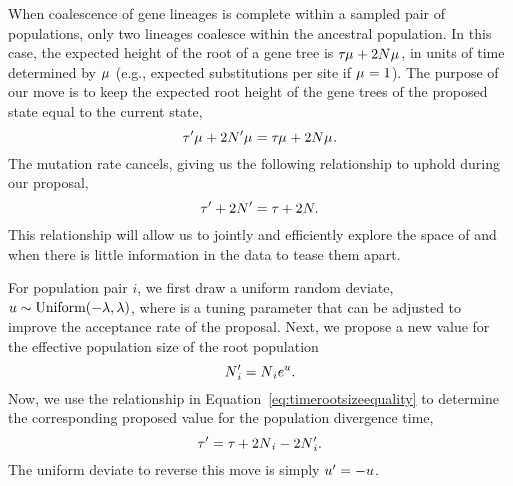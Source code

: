 \begin{linenomath}
When coalescence of gene lineages is complete within a sampled pair of
populations, only two lineages coalesce within the ancestral population.
In this case, the expected height of the root of a gene tree is
$\divtime\murate + 2\sepopsize[\rootpopindex]\murate$,
in units of time determined by $\murate$ (e.g., expected substitutions per site
if $\murate = 1$).
The purpose of our move is to keep the expected root height of the gene trees
of the proposed state equal to the current state,
\begin{equation}
    \divtime\proposed\murate + 2\sepopsize[\rootpopindex]{}\proposed\murate =
    \divtime\murate + 2\sepopsize[\rootpopindex]\murate.
\end{equation}
The mutation rate cancels, giving us the following relationship to uphold
during our proposal,
\begin{equation}
    \divtime\proposed + 2\sepopsize[\rootpopindex]{}\proposed =
    \divtime + 2\sepopsize[\rootpopindex].
    \label{eq:timerootsizeequality}
\end{equation}
This relationship will allow us to jointly and efficiently explore the space of
\divtime and \sepopsize[\rootpopindex] when there is little information in the
data to tease them apart.
\end{linenomath}

\begin{linenomath}
For population pair $i$, we first draw a uniform random deviate,
$\uniformdeviate \sim \textrm{Uniform}(-\tuningparameter, \tuningparameter)$,
where \tuningparameter is a tuning parameter that can be adjusted to 
improve the acceptance rate of the proposal.
Next, we propose a new value for the effective population size of the
root population
\[
    \sepopsize[\rootpopindex]{}_i\proposed = \sepopsize[\rootpopindex]{}_ie^{\uniformdeviate}.
\]
Now, we use the relationship in Equation~\ref{eq:timerootsizeequality} to
determine the corresponding proposed value for the population divergence time,
\begin{equation}
    \divtime\proposed =
    \divtime + 2\sepopsize[\rootpopindex]{}_i - 2\sepopsize[\rootpopindex]{}_i\proposed.
\end{equation}
The uniform deviate to reverse this move is simply
$\uniformdeviate\proposed = -\uniformdeviate$.
\end{linenomath}


